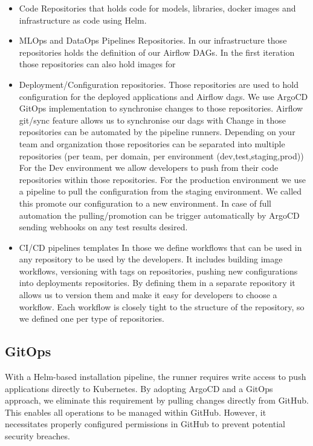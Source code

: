 \begin{itemize}
    \item Code Repositories that holds code for models, libraries, docker images and infrastructure as code using Helm.
    \item MLOps and DataOps Pipelines Repositories.
    In our infrastructure those repositories holds the definition of our Airflow DAGs.
    In the first iteration those repositories can also hold images for
    \item Deployment/Configuration repositories.
    Those repositories are used to hold configuration for the deployed applications and Airflow dags.
    We use ArgoCD GitOps implementation to synchronise changes to those repositories.
    Airflow git/sync feature allows us to synchronise our dags with
    Change in those repositories can be automated by the pipeline runners.
    Depending on your team and organization those repositories can be separated into multiple repositories (per team, per domain, per environment (dev,test,staging,prod))
    For the Dev environment we allow developers to push from their code repositories within those repositories.
    For the production environment we use a pipeline to pull the configuration from the staging environment.
    We called this promote our configuration to a new environment.
    In case of full automation the pulling/promotion can be trigger automatically by ArgoCD sending webhooks on any test results desired.
    \item CI/CD pipelines templates
    In those we define workflows that can be used in any repository to be used by the developers.
    It includes building image workflows, versioning with tags on repositories, pushing new configurations into deployments repositories.
    By defining them in a separate repository it allows us to version them and make it easy for developers to choose a workflow.
    Each workflow is closely tight to the structure of the repository, so we defined one per type of repositories.
\end{itemize}

\subsection{GitOps}
With a Helm-based installation pipeline, the runner requires write access to push applications directly to Kubernetes.
By adopting ArgoCD and a GitOps approach, we eliminate this requirement by pulling changes directly from GitHub.
This enables all operations to be managed within GitHub.
However, it necessitates properly configured permissions in GitHub to prevent potential security breaches.

